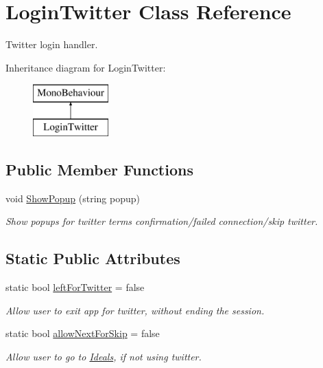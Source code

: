 \hypertarget{class_login_twitter}{}\section{Login\+Twitter Class Reference}
\label{class_login_twitter}


Twitter login handler.  


Inheritance diagram for Login\+Twitter\+:\begin{figure}[H]
\begin{center}
\leavevmode
\includegraphics[height=2.000000cm]{class_login_twitter}
\end{center}
\end{figure}
\subsection*{Public Member Functions}
\begin{DoxyCompactItemize}
\item 
\mbox{\label{class_login_twitter_aa41d307ac0099b8dd187f05d3d2aeab3}} 
void \mbox{\hyperlink{class_login_twitter_aa41d307ac0099b8dd187f05d3d2aeab3}{Show\+Popup}} (string popup)
\begin{DoxyCompactList}\small\item\em Show popups for twitter terms confirmation/failed connection/skip twitter. \end{DoxyCompactList}\end{DoxyCompactItemize}
\subsection*{Static Public Attributes}
\begin{DoxyCompactItemize}
\item 
\mbox{\label{class_login_twitter_a6719de883466089832df2f9f5189629e}} 
static bool \mbox{\hyperlink{class_login_twitter_a6719de883466089832df2f9f5189629e}{left\+For\+Twitter}} = false
\begin{DoxyCompactList}\small\item\em Allow user to exit app for twitter, without ending the session. \end{DoxyCompactList}\item 
\mbox{\label{class_login_twitter_ab5b6026e105743976dbc6d21ce55f83c}} 
static bool \mbox{\hyperlink{class_login_twitter_ab5b6026e105743976dbc6d21ce55f83c}{allow\+Next\+For\+Skip}} = false
\begin{DoxyCompactList}\small\item\em Allow user to go to \mbox{\hyperlink{class_ideals}{Ideals}}, if not using twitter. \end{DoxyCompactList}\end{DoxyCompactItemize}
